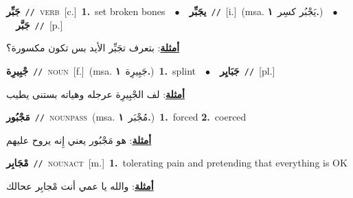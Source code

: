\documentclass[10pt,a4paper,twoside]{article} %
\begin{document}
\begin{multicols}{2}
{{\setlength\topsep{0pt}\textbf{\foreignlanguage{arabic}{جَبِّر}}\ {\color{gray}\texttt{//}\color{black}}\ \textsc{verb}\ [c.]\ \textbf{1.}~set broken bones\ \ $\bullet$\ \ \setlength\topsep{0pt}\textbf{\foreignlanguage{arabic}{يجَبِّر}}\ {\color{gray}\texttt{//}\color{black}}\ [i.]\ \color{gray}(msa. \foreignlanguage{arabic}{يَجْبُر كسِر}~\foreignlanguage{arabic}{\textbf{١.}})\color{black}\ \ $\bullet$\ \ \setlength\topsep{0pt}\textbf{\foreignlanguage{arabic}{جَبَّر}}\ {\color{gray}\texttt{//}\color{black}}\ [p.]\  \begin{flushright}\color{gray}\foreignlanguage{arabic}{\textbf{\underline{\foreignlanguage{arabic}{أمثلة}}}: بتعرف تجَبِّر الأيد بس تكون مكسورة؟}\end{flushright}\color{black}} \vspace{2mm}

{\setlength\topsep{0pt}\textbf{\foreignlanguage{arabic}{جْبِيرِة}}\ {\color{gray}\texttt{//}\color{black}}\ \textsc{noun}\ [f.]\ \color{gray}(msa. \foreignlanguage{arabic}{جَبِيرِة}~\foreignlanguage{arabic}{\textbf{١.}})\color{black}\ \textbf{1.}~splint\ \ $\bullet$\ \ \setlength\topsep{0pt}\textbf{\foreignlanguage{arabic}{جَبَايِر}}\ {\color{gray}\texttt{//}\color{black}}\ [pl.]\  \begin{flushright}\color{gray}\foreignlanguage{arabic}{\textbf{\underline{\foreignlanguage{arabic}{أمثلة}}}: لف الجْبِيرِة عرجله وهياته بستنى يطيب}\end{flushright}\color{black}} \vspace{2mm}

{\setlength\topsep{0pt}\textbf{\foreignlanguage{arabic}{مَجْبُور}}\ {\color{gray}\texttt{//}\color{black}}\ \textsc{noun\textunderscore pass}\ \color{gray}(msa. \foreignlanguage{arabic}{مُجْبَر}~\foreignlanguage{arabic}{\textbf{١.}})\color{black}\ \textbf{1.}~forced  \textbf{2.}~coerced\  \begin{flushright}\color{gray}\foreignlanguage{arabic}{\textbf{\underline{\foreignlanguage{arabic}{أمثلة}}}: هو مَجْبُور يعني إِنه يروح عليهم}\end{flushright}\color{black}} \vspace{2mm}

{\setlength\topsep{0pt}\textbf{\foreignlanguage{arabic}{مْجَابِر}}\ {\color{gray}\texttt{//}\color{black}}\ \textsc{noun\textunderscore act}\ [m.]\ \textbf{1.}~tolerating pain and pretending that everything is OK\  \begin{flushright}\color{gray}\foreignlanguage{arabic}{\textbf{\underline{\foreignlanguage{arabic}{أمثلة}}}: والله يا عمي أنت مْجابِر عحالك}\end{flushright}\color{black}} \vspace{2mm}

}
\end{multicols}
\end{document}
